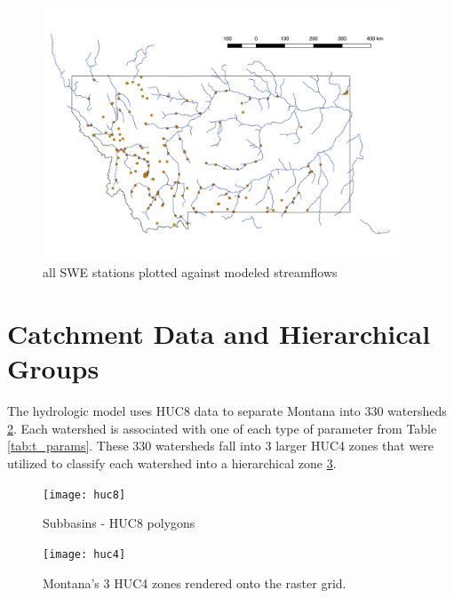 \begin{figure}[h]
    \centering
    \includegraphics[width=0.95\textwidth]{stations}
    \caption{all SWE stations plotted against modeled streamflows}
    \label{fig:stations}
\end{figure}

\section{Catchment Data and Hierarchical Groups}

The hydrologic model uses HUC8 data to separate Montana into 330 watersheds \ref{fig:huc8}. Each watershed is associated with one of each type of parameter from Table \ref{tab:t_params}. These 330 watersheds fall into 3 larger HUC4 zones that were utilized to classify each watershed into a hierarchical zone \ref{fig:huc4}.

\begin{figure}[h]
    \centering
    \texttt{[image: huc8]}
    \caption{Subbasins - HUC8 polygons}
    \label{fig:huc8}
\end{figure}

\begin{figure}[h]
    \centering
    \texttt{[image: huc4]}
    \caption{Montana's 3 HUC4 zones rendered onto the raster grid.}
    \label{fig:huc4}
\end{figure}
